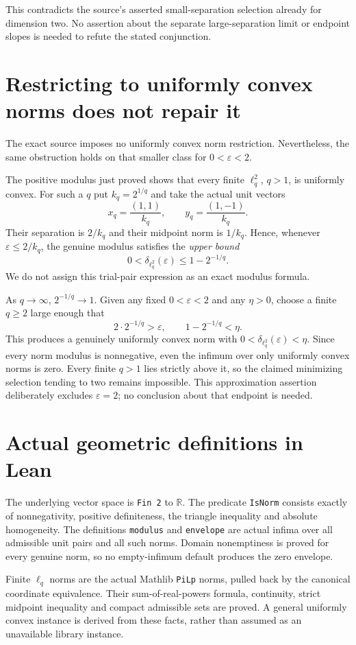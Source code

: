 \documentclass[11pt]{article}
\begin{document}
This contradicts the source's asserted small-separation
selection already for dimension two. No assertion about
the separate large-separation limit or endpoint slopes
is needed to refute the stated conjunction.

\newpage
\section*{Restricting to uniformly convex norms does not repair it}
The exact source imposes no uniformly convex norm
restriction. Nevertheless, the same obstruction holds
on that smaller class for $0<\varepsilon<2$.

The positive modulus just proved shows that every finite
$\ell_q^2$, $q>1$, is uniformly convex. For such a $q$ put
$k_q=2^{1/q}$ and take the actual unit vectors
\[
 x_q=\frac{(1,1)}{k_q},\qquad
 y_q=\frac{(1,-1)}{k_q}.
\]
Their separation is $2/k_q$ and their midpoint norm is
$1/k_q$. Hence, whenever $\varepsilon\leq2/k_q$, the
genuine modulus satisfies the \emph{upper bound}
\[
 0<\delta_{\ell_q^2}(\varepsilon)
 \leq1-2^{-1/q}.
\]
We do not assign this trial-pair expression as an exact
modulus formula.

As $q\to\infty$, $2^{-1/q}\to1$. Given any fixed
$0<\varepsilon<2$ and any $\eta>0$, choose a finite
$q\geq2$ large enough that
\[
 2\cdot2^{-1/q}>\varepsilon,
 \qquad 1-2^{-1/q}<\eta.
\]
This produces a genuinely uniformly convex norm with
$0<\delta_{\ell_q^2}(\varepsilon)<\eta$.
Since every norm modulus is nonnegative, even the
infimum over only uniformly convex norms is zero.
Every finite $q>1$ lies strictly above it, so the claimed
minimizing selection tending to two remains impossible.
This approximation assertion deliberately excludes
$\varepsilon=2$; no conclusion about that endpoint is
needed.

\section*{Actual geometric definitions in Lean}
The underlying vector space is \texttt{Fin 2} to
$\mathbb R$. The predicate \texttt{IsNorm} consists
exactly of nonnegativity, positive definiteness,
the triangle inequality and absolute homogeneity.
The definitions \texttt{modulus} and \texttt{envelope}
are actual infima over all admissible unit pairs and
all such norms. Domain nonemptiness is proved for every
genuine norm, so no empty-infimum default produces the
zero envelope.

Finite $\ell_q$ norms are the actual Mathlib
\texttt{PiLp} norms, pulled back by the canonical
coordinate equivalence. Their sum-of-real-powers formula,
continuity, strict midpoint inequality and compact
admissible sets are proved. A general uniformly convex
instance is derived from these facts, rather than
assumed as an unavailable library instance.
\end{document}
